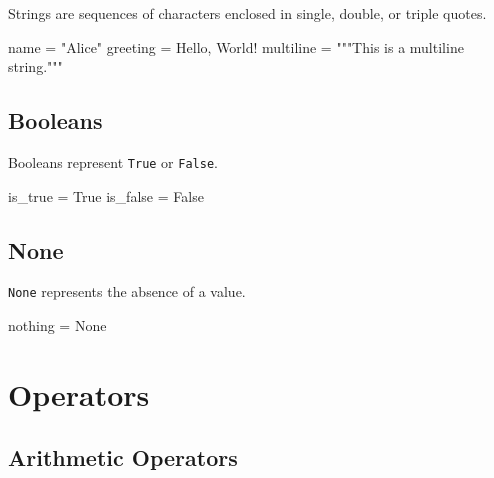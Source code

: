 \documentclass[
  letterpaper,
  DIV=11,
  numbers=noendperiod]{scrreprt}
\newenvironment{Shaded}{\begin{snugshade}}{\end{snugshade}}
\newcommand{\NormalTok}[1]{\textcolor[rgb]{0.00,0.23,0.31}{#1}}
\newcommand{\OperatorTok}[1]{\textcolor[rgb]{0.37,0.37,0.37}{#1}}
\newcommand{\StringTok}[1]{\textcolor[rgb]{0.13,0.47,0.30}{#1}}
\newcommand{\VariableTok}[1]{\textcolor[rgb]{0.07,0.07,0.07}{#1}}
\begin{document}
Strings are sequences of characters enclosed in single, double, or
triple quotes.

\begin{Shaded}
\begin{Highlighting}[]
\NormalTok{name }\OperatorTok{=} \StringTok{"Alice"}
\NormalTok{greeting }\OperatorTok{=} \StringTok{\textquotesingle{}Hello, World!\textquotesingle{}}
\NormalTok{multiline }\OperatorTok{=} \StringTok{"""This is}
\StringTok{a multiline}
\StringTok{string."""}
\end{Highlighting}
\end{Shaded}

\subsection{Booleans}\label{booleans}

Booleans represent \texttt{True} or \texttt{False}.

\begin{Shaded}
\begin{Highlighting}[]
\NormalTok{is\_true }\OperatorTok{=} \VariableTok{True}
\NormalTok{is\_false }\OperatorTok{=} \VariableTok{False}
\end{Highlighting}
\end{Shaded}

\subsection{None}\label{none}

\texttt{None} represents the absence of a value.

\begin{Shaded}
\begin{Highlighting}[]
\NormalTok{nothing }\OperatorTok{=} \VariableTok{None}
\end{Highlighting}
\end{Shaded}

\section{Operators}\label{operators}

\subsection{Arithmetic Operators}\label{arithmetic-operators}
\end{document}
